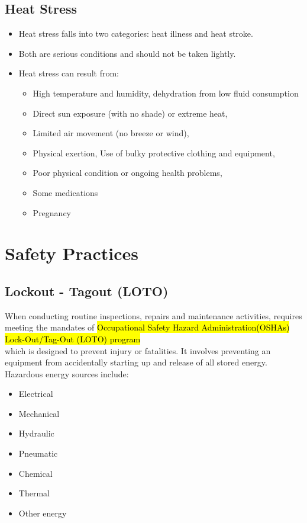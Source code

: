 \subsection{Heat Stress}
\begin{itemize}
\item Heat stress falls into two categories: heat illness and heat stroke. 
\item Both are serious conditions and should not be taken lightly. 
\item Heat stress can result from: 
\begin{itemize}
\item High temperature and humidity, dehydration from low fluid consumption
\item Direct sun exposure (with no shade) or extreme heat, 
\item Limited air movement (no breeze or wind), 
\item Physical exertion, Use of bulky protective clothing and equipment, 
\item Poor physical condition or ongoing health problems, 
\item Some medications
\item Pregnancy
\end{itemize}
\end{itemize} 


\section{Safety Practices}
\subsection{Lockout - Tagout (LOTO)}

When conducting routine inspections, repairs and maintenance activities, requires meeting the mandates of \hl{Occupational Safety  Hazard Administration(OSHAs) Lock-Out/Tag-Out (LOTO) program}\\
which is designed to prevent injury or fatalities.  It involves preventing an equipment from accidentally starting up and release of all stored energy.  Hazardous energy sources include: 
\begin{itemize}
\item Electrical 
\item Mechanical
\item Hydraulic
\item Pneumatic 
\item Chemical 
\item Thermal  
\item Other energy
\end{itemize}

